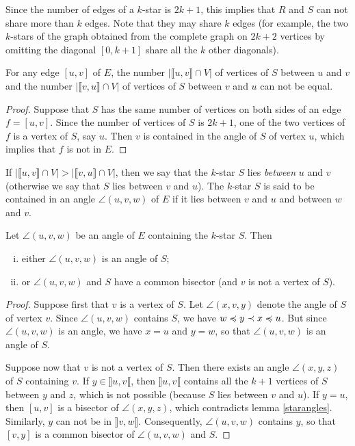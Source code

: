 \documentclass[12pt]{amsart}
\begin{document}
Since the number of edges of a $k$-star is $2k+1$, this implies that $R$ and $S$ can not share more than $k$ edges. Note that they may share $k$ edges (for example, the two $k$-stars of the graph obtained from the complete graph on $2k+2$ vertices by omitting the diagonal $[0,k+1]$ share all the $k$  other diagonals).

\begin{corollary}
For any edge $[u,v]$ of $E$, the number $|\llbracket u,v\rrbracket\cap V|$ of vertices of $S$ between $u$ and $v$ and the number $|\llbracket v,u\rrbracket\cap V|$ of vertices of $S$ between $v$ and $u$ can not be equal.
\end{corollary}

\begin{proof}
Suppose that $S$ has the same number of vertices on both sides of an edge $f=[u,v]$. Since the number of vertices of $S$ is $2k+1$, one of the two vertices of $f$ is a vertex of $S$, say $u$. Then $v$ is contained in the angle of $S$ of vertex $u$, which implies that $f$ is not in $E$.
\end{proof}

If $|\llbracket u,v\rrbracket\cap V|>|\llbracket v,u\rrbracket\cap V|$, then we say that the $k$-star $S$ lies \emph{between} $u$ and $v$ (otherwise we say that $S$ lies between $v$ and $u$). 
The $k$-star $S$ is said to be contained in an angle $\angle(u,v,w)$ of $E$ if it lies between $v$ and $u$ and between $w$ and $v$.

\begin{lemma}
Let $\angle(u,v,w)$ be an angle of $E$ containing the $k$-star $S$. Then
\begin{enumerate}[(i)]
\item either $\angle(u,v,w)$ is an angle of $S$;
\item or $\angle(u,v,w)$ and $S$ have a common bisector (and $v$ is not a vertex of $S$).
\end{enumerate}
\end{lemma}

\begin{proof}
Suppose first that $v$ is a vertex of $S$. Let $\angle(x,v,y)$ denote the angle of $S$ of vertex $v$. Since $\angle(u,v,w)$ contains $S$, we have $w\preccurlyeq y\prec x\preccurlyeq u$. But since $\angle(u,v,w)$ is an angle, we have $x=u$ and $y=w$, so that $\angle(u,v,w)$ is an angle of $S$.

Suppose now that $v$ is not a vertex of $S$. Then there exists an angle $\angle(x,y,z)$ of $S$ containing $v$. If $y\in\rrbracket u,v\llbracket$, then $\rrbracket u,v\llbracket$ contains all the $k+1$ vertices of $S$ between $y$ and $z$, which is not possible (because $S$ lies between $v$ and $u$). If $y=u$, then $[u,v]$ is a bisector of $\angle(x,y,z)$, which contradicts lemma \ref{starangles}. Similarly, $y$ can not be in $\rrbracket v,w\rrbracket$. Consequently, $\angle(u,v,w)$ contains $y$, so that $[v,y]$ is a common bisector of $\angle(u,v,w)$ and $S$.
\end{proof}
\end{document}
